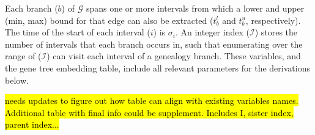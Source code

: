 \documentclass[11pt]{article}
\begin{document}
Each branch ($b$) of $\mathcal{G}$ spans one or more intervals
from which a lower and upper (min, max) bound for that 
edge can also be extracted ($t_b^l$ and $t_b^u$, respectively). 
The time of the start of each interval ($i$) is $\sigma_i$. 
An integer index ($\mathcal{I}$) stores the number of intervals that 
each branch occurs in, such that enumerating over the range
of ($\mathcal{I}$) can visit each interval of a genealogy branch.
These variables,
and the gene tree embedding table, include all relevant parameters
for the derivations below.

\hl{needs updates to figure out how table can align with existing variables names.
Additional table with final info could be supplement. Includes I, sister index, parent index...}

\end{document}
